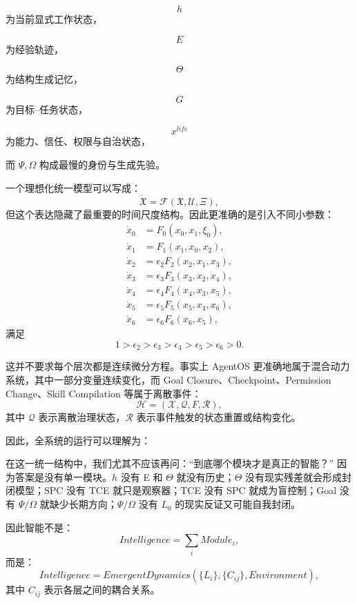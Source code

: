 \[
h
\]
为当前显式工作状态，

\[
E
\]
为经验轨迹，

\[
\Theta
\]
为结构生成记忆，

\[
G
\]
为目标--任务状态，

\[
x^{life}
\]
为能力、信任、权限与自治状态，

而 $\Psi,\Omega$ 构成最慢的身份与生成先验。

一个理想化统一模型可以写成：
\[
\dot{\mathfrak X}
=
\mathcal F
\left(
\mathfrak X,
\mathcal U,
\Xi
\right),
\]
但这个表达隐藏了最重要的时间尺度结构。因此更准确的是引入不同小参数：
\[
\begin{aligned}
\dot{x}_0 &= F_0(x_0,x_1,\xi_0),\\
\dot{x}_1 &= F_1(x_1,x_0,x_2),\\
\dot{x}_2 &= \epsilon_2F_2(x_2,x_1,x_3),\\
\dot{x}_3 &= \epsilon_3F_3(x_3,x_2,x_4),\\
\dot{x}_4 &= \epsilon_4F_4(x_4,x_3,x_5),\\
\dot{x}_5 &= \epsilon_5F_5(x_5,x_4,x_6),\\
\dot{x}_6 &= \epsilon_6F_6(x_6,x_5),
\end{aligned}
\]
满足
\[
1
>
\epsilon_2
>
\epsilon_3
>
\epsilon_4
>
\epsilon_5
>
\epsilon_6
>
0.
\]

这并不要求每个层次都是连续微分方程。事实上 AgentOS 更准确地属于混合动力系统，其中一部分变量连续变化，而 Goal Closure、Checkpoint、Permission Change、Skill Compilation 等属于离散事件：
\[
\mathcal H
=
(\mathcal X,\mathcal Q,F,\mathcal R),
\]
其中 $\mathcal Q$ 表示离散治理状态，$\mathcal R$ 表示事件触发的状态重置或结构变化。

因此，全系统的运行可以理解为：
\begin{statementbox}
\centering
{}
\end{statementbox}

在这一统一结构中，我们尤其不应该再问：``到底哪个模块才是真正的智能？'' 因为答案是没有单一模块。$h$ 没有 E 和 $\Theta$ 就没有历史；$\Theta$ 没有现实残差就会形成封闭模型；SPC 没有 TCE 就只是观察器；TCE 没有 SPC 就成为盲控制；Goal 没有 $\Psi/\Omega$ 就缺少长期方向；$\Psi/\Omega$ 没有 $L_0$ 的现实反证又可能自我封闭。

因此智能不是：
\[
Intelligence
=
\sum_i Module_i,
\]
而是：
\[
\boxed{
Intelligence
=
EmergentDynamics
\left(
\{L_i\},
\{C_{ij}\},
Environment
\right),
}
\]
其中 $C_{ij}$ 表示各层之间的耦合关系。

